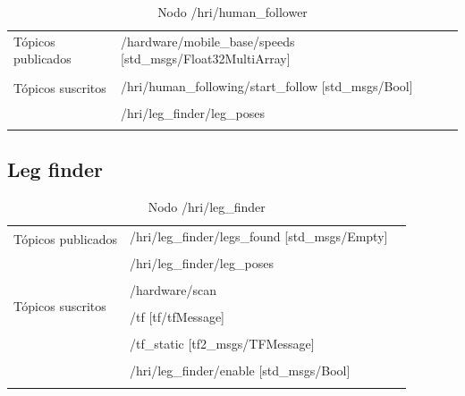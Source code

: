 \documentclass[user_manual.tex]{subfiles}
\begin{document}
\begin{table}[H]
\begin{center}
\begin{tabular}{|l|p{6cm}|p{5cm}|}%
\hline

Tópicos publicados
& /hardware/mobile\_base/speeds [std\_msgs/Float32MultiArray] &  \\
& & \\
\hline

\multirow{2}{*}{Tópicos suscritos}
& /hri/human\_following/start\_follow [std\_msgs/Bool] &  \\
& & \\
& /hri/leg\_finder/leg\_poses  &  \\
& & \\
\cline{1-3}

\end{tabular}
\caption{Nodo /hri/human\_follower}
\label{human follower node}
\end{center}
\end{table}

\subsection{Leg finder}

\begin{table}[H]
\begin{center}
\begin{tabular}{|l|p{6cm}|p{5cm}|}%
\hline

\multirow{2}{*}{Tópicos publicados}
& /hri/leg\_finder/legs\_found [std\_msgs/Empty] &  \\
& & \\
& /hri/leg\_finder/leg\_poses  &  \\
& & \\
\cline{1-3}

\multirow{4}{*}{Tópicos suscritos}
& /hardware/scan  &  \\
& & \\
& /tf [tf/tfMessage] &  \\
& & \\
& /tf\_static [tf2\_msgs/TFMessage] &  \\
& & \\
& /hri/leg\_finder/enable [std\_msgs/Bool]  &  \\
& & \\
\cline{1-3}

\end{tabular}
\caption{Nodo /hri/leg\_finder}
\label{leg finder node}
\end{center}
\end{table}
\end{document}
